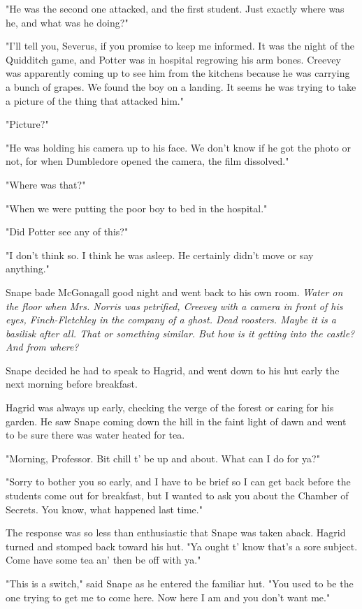 \documentclass[a4paper,11pt]{article}
\begin{document}
"He was the second one attacked, and the first student. Just exactly where was he, and what was he doing?"

"I'll tell you, Severus, if you promise to keep me informed. It was the night of the Quidditch game, and Potter was in hospital regrowing his arm bones. Creevey was apparently coming up to see him from the kitchens because he was carrying a bunch of grapes. We found the boy on a landing. It seems he was trying to take a picture of the thing that attacked him."

"Picture?"

"He was holding his camera up to his face. We don't know if he got the photo or not, for when Dumbledore opened the camera, the film dissolved."

"Where was that?"

"When we were putting the poor boy to bed in the hospital."

"Did Potter see any of this?"

"I don't think so. I think he was asleep. He certainly didn't move or say anything."

Snape bade McGonagall good night and went back to his own room. \emph{Water on the floor when Mrs. Norris was petrified, Creevey with a camera in front of his eyes, Finch-Fletchley in the company of a ghost. Dead roosters. Maybe it is a basilisk after all. That or something similar. But how is it getting into the castle? And from where?}

Snape decided he had to speak to Hagrid, and went down to his hut early the next morning before breakfast.

Hagrid was always up early, checking the verge of the forest or caring for his garden. He saw Snape coming down the hill in the faint light of dawn and went to be sure there was water heated for tea.

"Morning, Professor. Bit chill t' be up and about. What can I do for ya?"

"Sorry to bother you so early, and I have to be brief so I can get back before the students come out for breakfast, but I wanted to ask you about the Chamber of Secrets. You know, what happened last time."

The response was so less than enthusiastic that Snape was taken aback. Hagrid turned and stomped back toward his hut. "Ya ought t' know that's a sore subject. Come have some tea an' then be off with ya."

"This is a switch," said Snape as he entered the familiar hut. "You used to be the one trying to get me to come here. Now here I am and you don't want me."
\end{document}
